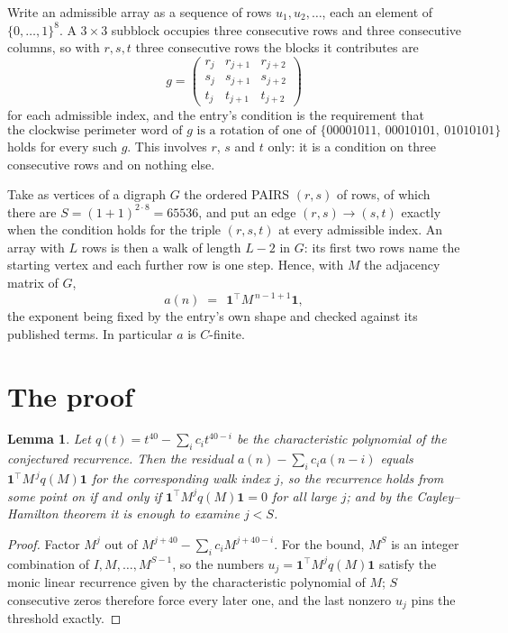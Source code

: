 \documentclass[11pt,a4paper]{article}
\theoremstyle{plain}
\newtheorem{lemma}[theorem]{Lemma}
\theoremstyle{definition}
\begin{document}
Write an admissible array as a sequence of rows $u_1,u_2,\dots$, each an element of
$\{0,\dots,1\}^{8}$. A $3\times3$ subblock occupies three consecutive rows and
three consecutive columns, so with $r,s,t$ three consecutive rows the blocks it
contributes are
\[
g=\begin{pmatrix}r_j&r_{j+1}&r_{j+2}\\ s_j&s_{j+1}&s_{j+2}\\ t_j&t_{j+1}&t_{j+2}\end{pmatrix}
\]
for each admissible index, and the entry's condition is the requirement that
\[
\text{the clockwise perimeter word of }g\text{ is a rotation of one of }\{00001011,\ 00010101,\ 01010101\}
\]
holds for every such $g$. This involves $r$, $s$ and $t$ only: it is a condition on
three consecutive rows and on nothing else.

Take as vertices of a digraph $G$ the ordered PAIRS $(r,s)$ of rows, of which there are
$S=(1+1)^{2\cdot8}=65536$, and put an edge $(r,s)\to(s,t)$ exactly when the condition
holds for the triple $(r,s,t)$ at every admissible index. An array with $L$ rows is then a
walk of length $L-2$ in $G$: its first two rows name the starting vertex and each further
row is one step. Hence, with $M$ the adjacency matrix of $G$,
\[
a(n)\;=\;\,\mathbf{1}^{\!\top}M^{\,n-1+1}\mathbf{1},
\]
the exponent being fixed by the entry's own shape and checked against its published terms.
In particular $a$ is $C$-finite.

\section{The proof}

\begin{lemma}\label{lem:crit}
Let $q(t)=t^{40}-\sum_i c_it^{40-i}$ be the characteristic polynomial of the
conjectured recurrence. Then the residual $a(n)-\sum_ic_ia(n-i)$ equals
$\mathbf{1}^{\!\top}M^{\,j}q(M)\mathbf{1}$ for the corresponding walk index
$j$, so the recurrence holds from some point on if and only if
$\mathbf{1}^{\!\top}M^{j}q(M)\mathbf{1}=0$ for all large $j$; and by the
Cayley--Hamilton theorem it is enough to examine $j<S$.
\end{lemma}

\begin{proof}
Factor $M^{j}$ out of $M^{j+40}-\sum_ic_iM^{j+40-i}$. For the bound, $M^{S}$
is an integer combination of $I,M,\dots,M^{S-1}$, so the numbers
$u_j=\mathbf{1}^{\!\top}M^{j}q(M)\mathbf{1}$ satisfy the monic linear recurrence given by
the characteristic polynomial of $M$; $S$ consecutive zeros therefore force every later one,
and the last nonzero $u_j$ pins the threshold exactly.
\end{proof}
\end{document}
